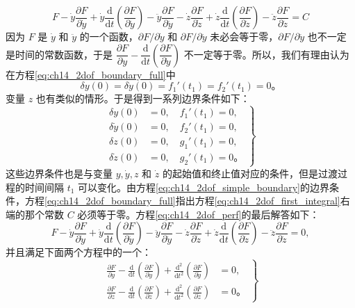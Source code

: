 \begin{equation}
F-\dot{y}\frac{\partial F}{\partial \dot{y}}
+\dot{y}\frac{\mathrm{d}}{\mathrm{d}t}\left(\frac{\partial F}{\partial \ddot{y}}\right)
-\ddot{y}\frac{\partial F}{\partial \ddot{y}}
-\dot{z}\frac{\partial F}{\partial \dot{z}}
+\dot{z}\frac{\mathrm{d}}{\mathrm{d}t}\left(\frac{\partial F}{\partial \ddot{z}}\right)
-\ddot{z}\frac{\partial F}{\partial \ddot{z}}
= C
\label{eq:ch14_2dof_first_integral}
\end{equation}
因为 $F$ 是 $\dot{y}$ 和 $\ddot{y}$ 的一个函数，$\partial F/\partial \dot{y}$ 和 $\partial F/\partial \ddot{y}$ 未必会等于零，$\partial F/\partial \ddot{y}$ 也不一定是时间的常数函数，于是 $\dfrac{\partial F}{\partial y}-\dfrac{\mathrm{d}}{\mathrm{d}t}\left(\dfrac{\partial F}{\partial \dot{y}}\right)$ 不一定等于零。所以，我们有理由认为在方程\eqref{eq:ch14_2dof_boundary_full}中
\begin{equation*}
\delta y(0)=\delta\dot{y}(0)=f_1'(t_1)=f_2'(t_1)=0。
\end{equation*}
变量 $z$ 也有类似的情形。于是得到一系列边界条件如下：
\begin{equation}
\left.
\begin{aligned}
\delta y(0) &= 0,\quad f_1'(t_1) = 0, \\
\delta\dot{y}(0) &= 0,\quad f_2'(t_1) = 0, \\
\delta z(0) &= 0,\quad g_1'(t_1) = 0, \\
\delta\dot{z}(0) &= 0,\quad g_2'(t_1) = 0。
\end{aligned}
\right\}
\label{eq:ch14_2dof_simple_boundary}
\end{equation}
这些边界条件也是与变量 $y,\dot{y},z$ 和 $\dot{z}$ 的起始值和终止值对应的条件，但是过渡过程的时间间隔 $t_1$ 可以变化。由方程\eqref{eq:ch14_2dof_simple_boundary}的边界条件，方程\eqref{eq:ch14_2dof_boundary_full}指出方程\eqref{eq:ch14_2dof_first_integral}右端的那个常数 $C$ 必须等于零。方程\eqref{eq:ch14_2dof_perf}的最后解答如下：
\begin{equation}
F-\dot{y}\frac{\partial F}{\partial \dot{y}}
+\dot{y}\frac{\mathrm{d}}{\mathrm{d}t}\left(\frac{\partial F}{\partial \ddot{y}}\right)
-\ddot{y}\frac{\partial F}{\partial \ddot{y}}
-\dot{z}\frac{\partial F}{\partial \dot{z}}
+\dot{z}\frac{\mathrm{d}}{\mathrm{d}t}\left(\frac{\partial F}{\partial \ddot{z}}\right)
-\ddot{z}\frac{\partial F}{\partial \ddot{z}}
= 0,
\label{eq:ch14_2dof_final_sol}
\end{equation}
并且满足下面两个方程中的一个：
\begin{equation}
\left.
\begin{aligned}
\frac{\partial F}{\partial y}
-\frac{\mathrm{d}}{\mathrm{d}t}\left(\frac{\partial F}{\partial \dot{y}}\right)
+\frac{\mathrm{d}^2}{\mathrm{d}t^2}\left(\frac{\partial F}{\partial \ddot{y}}\right) &= 0, \\
\frac{\partial F}{\partial z}
-\frac{\mathrm{d}}{\mathrm{d}t}\left(\frac{\partial F}{\partial \dot{z}}\right)
+\frac{\mathrm{d}^2}{\mathrm{d}t^2}\left(\frac{\partial F}{\partial \ddot{z}}\right) &= 0。
\end{aligned}
\right\}
\label{eq:ch14_2dof_final_euler}
\end{equation}
